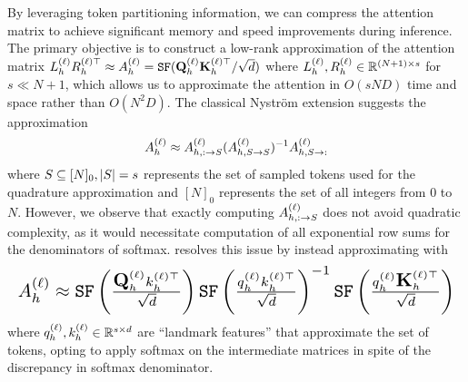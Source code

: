 By leveraging token partitioning information, we can compress the attention matrix to achieve significant memory and speed improvements during inference. The primary objective is to construct a low-rank approximation of the attention matrix $L^{(\ell)}_hR_h^{(\ell)\top} \approx A^{(\ell)}_h = \texttt{SF}(\mbox{{\bfseries Q}}^{(\ell)}_h \mbox{{\bfseries K}}^{(\ell)\top}_h / \sqrt{d})$ where $L^{(\ell)}_h, R^{(\ell)}_h \in \mathbb{R}^{(N + 1) \times s}$ for $s \ll N + 1$, which allows us to approximate the attention in $O(sND)$ time and space rather than $O(N^2D)$. The classical Nystr\"om extension suggests the approximation
\vspace{-4pt} \begin{align}
    A^{(\ell)}_h
    \approx A^{(\ell)}_{h, : \to S} (A^{(\ell)}_{h, S \to S})^{-1} A^{(\ell)}_{h, S \to :}
\end{align} where $S \subseteq [N]_0, \left\lvert S \right\rvert = s$ represents the set of sampled tokens used for the quadrature approximation and $[N]_0$ represents the set of all integers from $0$ to $N$. However, we observe that exactly computing $A^{(\ell)}_{h, : \to S}$ does not avoid quadratic complexity, as it would necessitate computation of all exponential row sums for the denominators of softmax. \cite{xiong2021nystromformer} resolves this issue by instead approximating with \vspace{-4pt} \begin{align}
    \resizebox{\columnwidth}{!}{$
        \Al{\ell}_h
        \approx \sf\pfrac{\Ql{\ell}_h k^{(\ell)\top}_h}{\sqrt{d}} \sf\pfrac{\ql{\ell}_h k^{(\ell)\top}_h}{\sqrt{d}}^{-1} \sf\pfrac{\ql{\ell}_h \mbf{K}^{(\ell)\top}_h}{\sqrt{d}}
    $}
\end{align}
where $q^{(\ell)}_h, k^{(\ell)}_h \in \mathbb{R}^{s \times d}$ are ``landmark features'' that approximate the set of tokens, opting to apply softmax on the intermediate matrices in spite of the discrepancy in softmax denominator.









